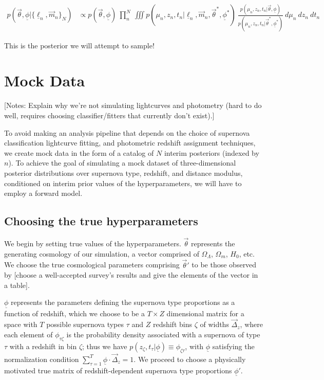 \documentclass[12pt, onecolumn]{emulateapj}
\newcommand{\textul}{\underline}
\begin{document}
\begin{align}
p(\vec{\theta}, \textul{\phi} | \{\textul{\ell}_{n}, \vec{m}_{n}\}_{N}) &\propto p(\vec{\theta}, \textul{\phi})\ \prod_{n}^{N}\ \iiint p(\mu_{n}, z_{n}, t_{n} | \textul{\ell}_{n}, \vec{m}_{n}, \vec{\theta}^{*}, \textul{\phi}^{*})\ \frac{p(\mu_{n}, z_{n}, t_{n} | \vec{\theta}, \textul{\phi})}{p(\mu_{n}, z_{n}, t_{n} | \vec{\theta}^{*}, \textul{\phi}^{*})}\ d\mu_{n}\ dz_{n}\ dt_{n}
\end{align}

This is the posterior we will attempt to sample!

\section{Mock Data}
\label{sec:data}

[Notes: Explain why we're not simulating lightcurves and photometry (hard to do well, requires choosing classifier/fitters that currently don't exist).]

To avoid making an analysis pipeline that depends on the choice of supernova classification lightcurve fitting, and photometric redshift assignment techniques, we create mock data in the form of a catalog of $N$ interim posteriors (indexed by $n$).  To achieve the goal of simulating a mock dataset of three-dimensional posterior distributions over supernova type, redshift, and distance modulus, conditioned on interim prior values of the hyperparameters, we will have to employ a forward model.

\subsection{Choosing the true hyperparameters}
\label{sec:true_hypers}

We begin by setting true values of the hyperparameters.  $\vec{\theta}$ represents the generating cosmology of our simulation, a vector comprised of $\Omega_{\Lambda}$, $\Omega_{m}$, $H_{0}$, etc.  We choose the true cosmological parameters comprising $\vec{\theta}'$ to be those observed by [choose a well-accepted survey's results and give the elements of the vector in a table].  

$\textul{\phi}$ represents the parameters defining the supernova type proportions as a function of redshift, which we choose to be a $T\times Z$ dimensional matrix for a space with $T$ possible supernova types $\tau$ and $Z$ redshift bins $\zeta$ of widths $\vec{\Delta}_{z}$, where each element of $\phi_{\tau\zeta}$ is the probability density associated with a supernova of type $\tau$ with a redshift in bin $\zeta$; thus we have $p(z_{\zeta}, t_{\tau} | \textul{\phi}) \equiv \phi_{\zeta\tau}$, with $\textul{\phi}$ satisfying the normalization condition $\sum_{\tau=1}^{T}\textul{\phi}\cdot\vec{\Delta}_{z}=1$.  We proceed to choose a physically motivated true matrix of redshift-dependent supernova type proportions $\textul{\phi}'$.
\end{document}
